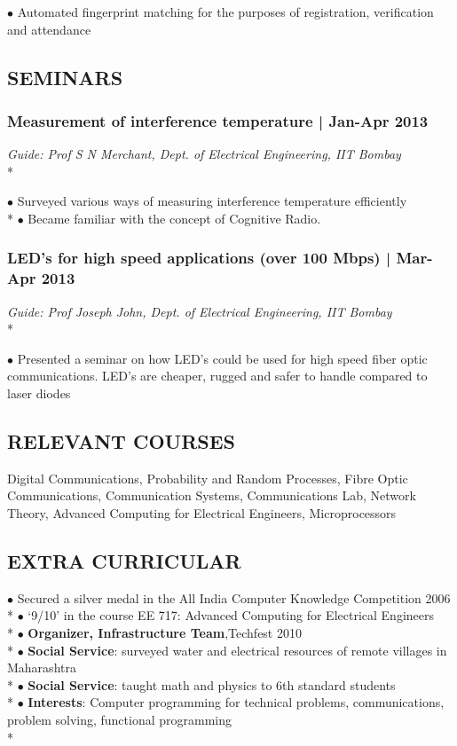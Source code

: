 \documentclass[12pt]{article}
\begin{document}
\noindent $\bullet$ Automated fingerprint matching for the purposes of registration, verification and attendance
 

\subsection*{\uppercase{Seminars}}
\subsubsection*{Measurement of interference temperature | Jan-Apr 2013} 

\emph{Guide: Prof S N Merchant, Dept. of Electrical Engineering, IIT Bombay} \\*
  
\noindent $\bullet$ Surveyed various ways of measuring interference temperature efficiently \\*
$\bullet$ Became familiar with the concept of Cognitive Radio.
 

\subsubsection*{LED's for high speed applications (over 100 Mbps) | Mar-Apr 2013}

\emph{Guide: Prof Joseph John, Dept. of Electrical Engineering, IIT Bombay} \\*
  
\noindent $\bullet$ Presented a seminar on how LED's could be used for high speed fiber optic communications. LED's are cheaper, rugged and safer to handle compared to laser diodes
 

\subsection*{\uppercase{RELEVANT COURSES}}

Digital Communications, Probability and Random Processes, Fibre Optic Communications, 
Communication Systems, Communications Lab, Network Theory,
Advanced Computing for Electrical Engineers, Microprocessors

\subsection*{\uppercase{Extra curricular}}

  
\noindent $\bullet$ Secured a silver medal in the All India Computer Knowledge Competition 2006 \\*
$\bullet$ `9/10' in the course EE 717: Advanced Computing for Electrical Engineers \\*
$\bullet$ \textbf{Organizer, Infrastructure Team},Techfest 2010 \\*
$\bullet$ \textbf{Social Service}: surveyed water and electrical resources of remote villages in Maharashtra \\*
$\bullet$ \textbf{Social Service}: taught math and physics to 6th standard students \\*
$\bullet$ \textbf{Interests}:  Computer programming for technical problems, communications, problem solving, functional programming \\*
\end{document}
